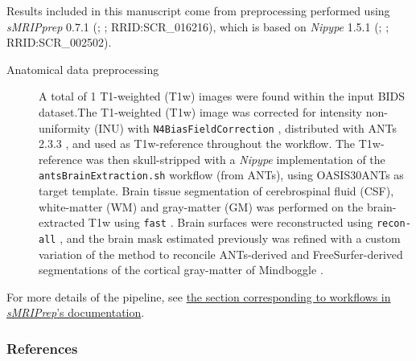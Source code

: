 \documentclass[]{article}
\date{}
\begin{document}
Results included in this manuscript come from preprocessing performed
using \emph{sMRIPprep} 0.7.1 (\citet{fmriprep1}; \citet{fmriprep2};
RRID:SCR\_016216), which is based on \emph{Nipype} 1.5.1
(\citet{nipype1}; \citet{nipype2}; RRID:SCR\_002502).

\begin{description}
\item[Anatomical data preprocessing]
A total of 1 T1-weighted (T1w) images were found within the input BIDS
dataset.The T1-weighted (T1w) image was corrected for intensity
non-uniformity (INU) with \texttt{N4BiasFieldCorrection} \citep{n4},
distributed with ANTs 2.3.3 \citep[RRID:SCR\_004757]{ants}, and used as
T1w-reference throughout the workflow. The T1w-reference was then
skull-stripped with a \emph{Nipype} implementation of the
\texttt{antsBrainExtraction.sh} workflow (from ANTs), using OASIS30ANTs
as target template. Brain tissue segmentation of cerebrospinal fluid
(CSF), white-matter (WM) and gray-matter (GM) was performed on the
brain-extracted T1w using \texttt{fast} \citep[FSL 5.0.9,
RRID:SCR\_002823,][]{fsl_fast}. Brain surfaces were reconstructed using
\texttt{recon-all} \citep[FreeSurfer 6.0.1,
RRID:SCR\_001847,][]{fs_reconall}, and the brain mask estimated
previously was refined with a custom variation of the method to
reconcile ANTs-derived and FreeSurfer-derived segmentations of the
cortical gray-matter of Mindboggle
\citep[RRID:SCR\_002438,][]{mindboggle}.
\end{description}

For more details of the pipeline, see
\href{https://smriprep.readthedocs.io/en/latest/workflows.html}{the
section corresponding to workflows in \emph{sMRIPrep}'s documentation}.

\hypertarget{references}{%
\subsubsection{References}\label{references}}


\end{document}
